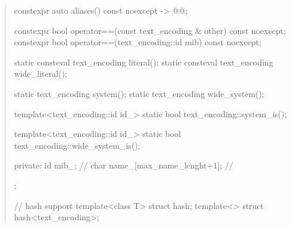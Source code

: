 \documentclass{wg21}
\begin{document}
\begin{quote}
\begin{addedblock}
\begin{codeblock}
{{    constexpr auto aliases() const noexcept -> @{\seebelow}@;

    constexpr bool operator==(const text_encoding & other) const noexcept;
    constexpr bool operator==(text_encoding::id mib) const noexcept;

    static consteval text_encoding literal();
    static consteval text_encoding wide_literal();

    static text_encoding system();
    static text_encoding wide_system();
    
    
    template<text_encoding::id id_>
    static bool text_encoding::system_is();
    
    template<text_encoding::id id_>
    static bool text_encoding::wide_system_is();

    private:
        id mib_; // \expos
        char name_[max_name_lenght+1]; // \expos
    };


// hash support
template<class T> struct hash;
template<> struct hash<text_encoding>;

}


\end{codeblock}
\end{addedblock}
\end{quote}
\end{document}

